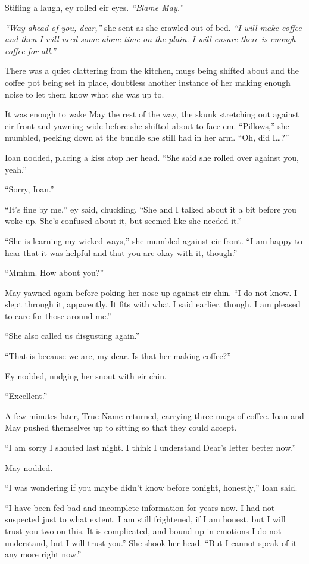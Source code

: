 Stifling a laugh, ey rolled eir eyes. \emph{``Blame May.''}

\emph{``Way ahead of you, dear,''} she sent as she crawled out of bed. \emph{``I will make coffee and then I will need some alone time on the plain. I will ensure there is enough coffee for all.''}

There was a quiet clattering from the kitchen, mugs being shifted about and the coffee pot being set in place, doubtless another instance of her making enough noise to let them know what she was up to.

It was enough to wake May the rest of the way, the skunk stretching out against eir front and yawning wide before she shifted about to face em. ``Pillows,'' she mumbled, peeking down at the bundle she still had in her arm. ``Oh, did I\ldots?''

Ioan nodded, placing a kiss atop her head. ``She said she rolled over against you, yeah.''

``Sorry, Ioan.''

``It's fine by me,'' ey said, chuckling. ``She and I talked about it a bit before you woke up. She's confused about it, but seemed like she needed it.''

``She is learning my wicked ways,'' she mumbled against eir front. ``I am happy to hear that it was helpful and that you are okay with it, though.''

``Mmhm. How about you?''

May yawned again before poking her nose up against eir chin. ``I do not know. I slept through it, apparently. It fits with what I said earlier, though. I am pleased to care for those around me.''

``She also called us disgusting again.''

``That is because we are, my dear. Is that her making coffee?''

Ey nodded, nudging her snout with eir chin.

``Excellent.''

A few minutes later, True Name returned, carrying three mugs of coffee. Ioan and May pushed themselves up to sitting so that they could accept.

``I am sorry I shouted last night. I think I understand Dear's letter better now.''

May nodded.

``I was wondering if you maybe didn't know before tonight, honestly,'' Ioan said.

``I have been fed bad and incomplete information for years now. I had not suspected just to what extent. I am still frightened, if I am honest, but I will trust you two on this. It is complicated, and bound up in emotions I do not understand, but I will trust you.'' She shook her head. ``But I cannot speak of it any more right now.''

